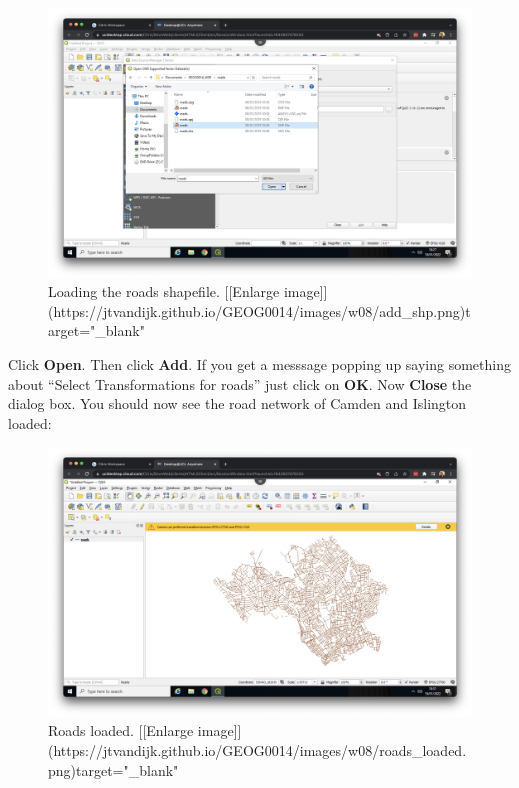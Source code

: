 \documentclass[
]{book}
\begin{document}
\begin{figure}

{\centering \includegraphics[width=850pt]{images/w08/add_shp} 

}

\caption{Loading the roads shapefile. [[Enlarge image]](https://jtvandijk.github.io/GEOG0014/images/w08/add_shp.png){target="_blank"}}\label{fig:add-shp}
\end{figure}

Click \textbf{Open}. Then click \textbf{Add}. If you get a messsage popping up saying something about ``Select Transformations for roads'' just click on \textbf{OK}. Now \textbf{Close} the dialog box. You should now see the road network of Camden and Islington loaded:

\begin{figure}

{\centering \includegraphics[width=850pt]{images/w08/roads_loaded} 

}

\caption{Roads loaded. [[Enlarge image]](https://jtvandijk.github.io/GEOG0014/images/w08/roads_loaded.png){target="_blank"}}\label{fig:roads-loaded}
\end{figure}
\end{document}
